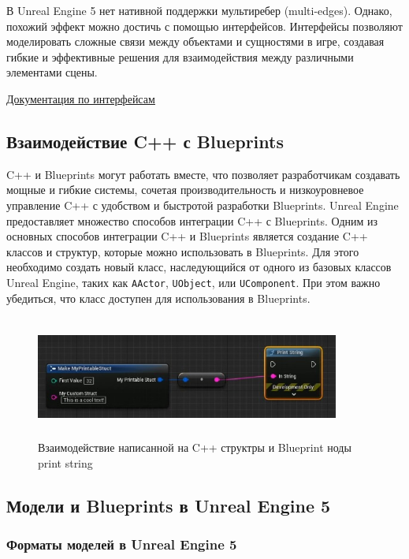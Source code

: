 В Unreal Engine 5 нет нативной поддержки мультиребер (multi-edges). Однако, похожий эффект можно достичь с помощью интерфейсов. Интерфейсы позволяют моделировать сложные связи между объектами и сущностями в игре, создавая гибкие и эффективные решения для взаимодействия между различными элементами сцены.

\href{https://dev.epicgames.com/documentation/en-us/unreal-engine/blueprint-interface-in-unreal-engine?application_version=5.1}{\underline{Документация по интерфейсам}}

\subsection{Взаимодействие C++ с Blueprints}

C++ и Blueprints могут работать вместе, что позволяет разработчикам создавать мощные и гибкие системы, сочетая производительность и низкоуровневое управление C++ с удобством и быстротой разработки Blueprints. Unreal Engine предоставляет множество способов интеграции C++ с Blueprints.
\newline
Одним из основных способов интеграции C++ и Blueprints является создание C++ классов и структур, которые можно использовать в Blueprints. Для этого необходимо создать новый класс, наследующийся от одного из базовых классов Unreal Engine, таких как \texttt{AActor}, \texttt{UObject}, или \texttt{UComponent}. При этом важно убедиться, что класс доступен для использования в Blueprints.

\begin{figure}[H]
    \centering
    \includegraphics[height=4cm, width=10cm]{blueprints_with_cpp.jpeg}
    \caption{Взаимодействие написанной на C++ структры и Blueprint ноды print string}
\end{figure}

\subsection{Модели и Blueprints в Unreal Engine 5}

\subsubsection{Форматы моделей в Unreal Engine 5}

